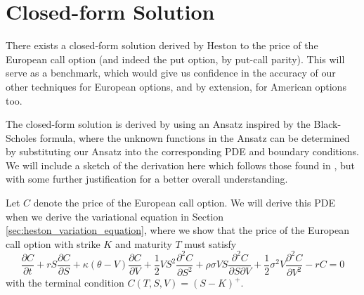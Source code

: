 \section{Closed-form Solution}

There exists a closed-form solution derived by Heston \cite{heston1993closed} to the price of the European call option (and indeed the put option, by put-call parity). This will serve as a benchmark, which would give us confidence in the accuracy of our other techniques for European options, and by extension, for American options too.

The closed-form solution is derived by using an Ansatz inspired by the Black-Scholes formula, where the unknown functions in the Ansatz can be determined by substituting our Ansatz into the corresponding PDE and boundary conditions. We will include a sketch of the derivation here which follows those found in \cite{heston1993closed, gatheral2011volatility}, but with some further justification for a better overall understanding.

Let $C$ denote the price of the European call option. We will derive this PDE when we derive the variational equation in Section \ref{sec:heston_variation_equation}, where we show that the price of the European call option with strike $K$ and maturity $T$ must satisfy
\begin{equation}
    \frac{\partial C}{\partial t} + rS \frac{\partial C}{\partial S} + \kappa (\theta - V) \frac{\partial C}{\partial V} + \frac 12 VS^2 \frac{\partial ^2 C}{\partial S^2} + \rho \sigma V S \frac{\partial ^2 C}{\partial S \partial V} + \frac 12 \sigma^2 V \frac{\partial ^2 C}{\partial V^2} - rC = 0
\label{eq:heston_feynman_kac_pde}
\end{equation}
with the terminal condition $C(T, S, V) = (S-K)^+$.

